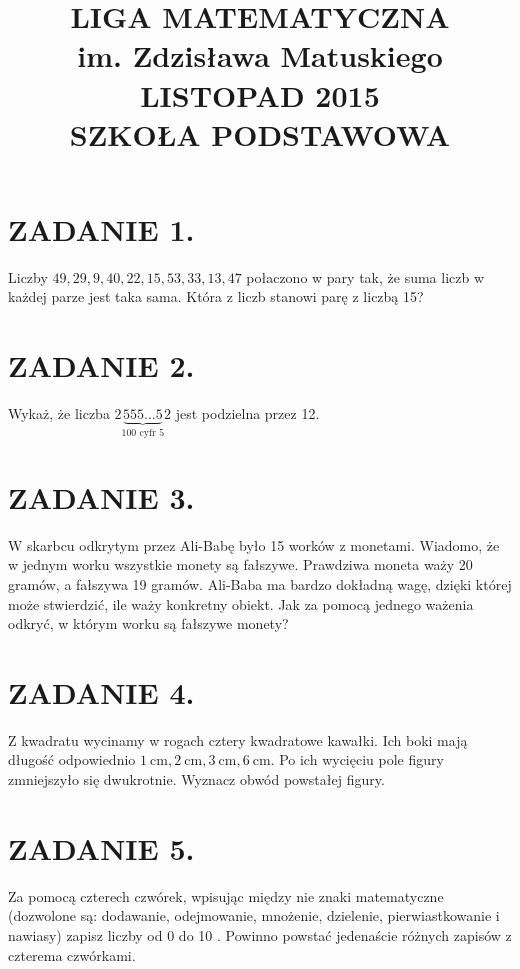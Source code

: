 \documentclass[10pt]{article}
\title{LIGA MATEMATYCZNA \\
 im. Zdzisława Matuskiego \\
 LISTOPAD 2015 \\
 SZKOŁA PODSTAWOWA }
\author{}
\date{}
\begin{document}
\maketitle
\section*{ZADANIE 1.}
Liczby \(49,29,9,40,22,15,53,33,13,47\) połaczono w pary tak, że suma liczb w każdej parze jest taka sama. Która z liczb stanowi parę z liczbą 15?

\section*{ZADANIE 2.}
Wykaż, że liczba \(2 \underbrace{555 \ldots 5}_{100 \text { cyfr } 5} 2\) jest podzielna przez 12.

\section*{ZADANIE 3.}
W skarbcu odkrytym przez Ali-Babę było 15 worków z monetami. Wiadomo, że w jednym worku wszystkie monety są fałszywe. Prawdziwa moneta waży 20 gramów, a fałszywa 19 gramów. Ali-Baba ma bardzo dokładną wagę, dzięki której może stwierdzić, ile waży konkretny obiekt. Jak za pomocą jednego ważenia odkryć, w którym worku są fałszywe monety?

\section*{ZADANIE 4.}
Z kwadratu wycinamy w rogach cztery kwadratowe kawałki. Ich boki mają długość odpowiednio \(1 \mathrm{~cm}, 2 \mathrm{~cm}, 3 \mathrm{~cm}, 6 \mathrm{~cm}\). Po ich wycięciu pole figury zmniejszyło się dwukrotnie. Wyznacz obwód powstałej figury.

\section*{ZADANIE 5.}
Za pomocą czterech czwórek, wpisując między nie znaki matematyczne (dozwolone są: dodawanie, odejmowanie, mnożenie, dzielenie, pierwiastkowanie i nawiasy) zapisz liczby od 0 do 10 . Powinno powstać jedenaście różnych zapisów z czterema czwórkami.
\end{document}
